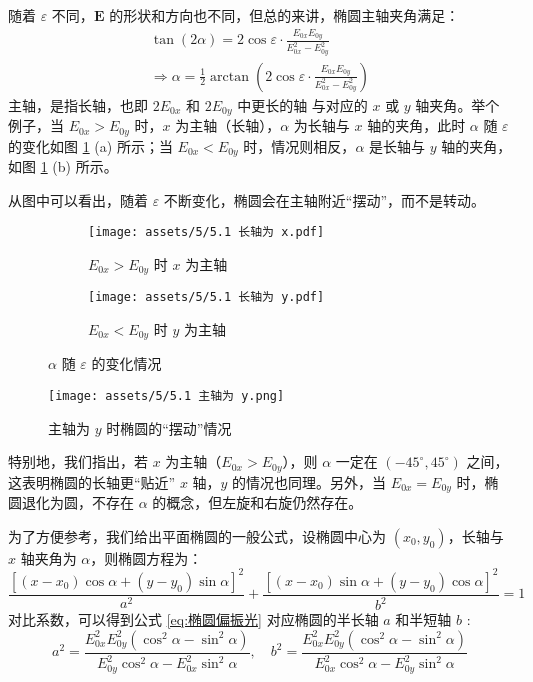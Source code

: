 \documentclass[UTF8]{report}
\theoremstyle{MyLineTheoremStyle} %
\theoremstyle{MyBlockTheoremStyle} %
\theoremstyle{MySubsubsectionStyle} %
\begin{document}
随着 $\varepsilon$ 不同，$\boldsymbol{E}$ 的形状和方向也不同，但总的来讲，椭圆主轴夹角满足：
\begin{gather}
\tan \left(2 \alpha\right) = 2 \cos \varepsilon \cdot \frac{E_{0x}E_{0y}}{E_{0x}^2 - E_{0y}^2} \\ 
\Longrightarrow \alpha = \frac{1}{2} \arctan \left(2 \cos \varepsilon \cdot \frac{E_{0x}E_{0y}}{E_{0x}^2 - E_{0y}^2}\right)
\end{gather}
主轴，是指长轴，也即 $2E_{0x}$ 和 $2E_{0y}$ 中更长的轴{\color{red} 与对应的 $x$ 或 $y$ 轴夹角}。举个例子，当 $E_{0x} > E_{0y}$ 时，$x$ 为主轴（长轴），$\alpha$ 为长轴与 $x$ 轴的夹角，此时 $\alpha$ 随 $\varepsilon$ 的变化如图 \ref{fig:alpha} (a) 所示；当 $E_{0x} < E_{0y}$ 时，情况则相反，$\alpha$ 是长轴与 $y$ 轴的夹角，如图 \ref{fig:alpha} (b) 所示。

从图中可以看出，随着 $\varepsilon$ 不断变化，椭圆会在主轴附近“摆动”，而不是转动。
\begin{figure}[H]\centering
\begin{subfigure}[b]{0.5\columnwidth}\centering
    \texttt{[image: assets/5/5.1 长轴为 x.pdf]}
    \caption{$E_{0x} > E_{0y}$ 时 $x$ 为主轴}
\end{subfigure}\hfill
\begin{subfigure}[b]{0.5\columnwidth}\centering
    \texttt{[image: assets/5/5.1 长轴为 y.pdf]}
    \caption{$E_{0x} < E_{0y}$ 时 $y$ 为主轴}
\end{subfigure}
\caption{$\alpha$ 随 $\varepsilon$ 的变化情况}
\label{fig:alpha}
\end{figure}
\begin{figure}[H]\centering
    \texttt{[image: assets/5/5.1 主轴为 y.png]}
    \caption{主轴为 $y$ 时椭圆的“摆动”情况}
\end{figure}
特别地，我们指出，若 $x$ 为主轴（$E_{0x} > E_{0y}$），则 $\alpha$ 一定在 $(-45^\circ, 45^\circ)$ 之间，这表明椭圆的长轴更“贴近” $x$ 轴，$y$ 的情况也同理。另外，当 $E_{0x} = E_{0y}$ 时，椭圆退化为圆，不存在 $\alpha$ 的概念，但左旋和右旋仍然存在。

为了方便参考，我们给出平面椭圆的一般公式，设椭圆中心为 $(x_0, y_0)$，长轴与 $x$ 轴夹角为 $\alpha$，则椭圆方程为：
\begin{equation}
\frac{\left[(x - x_0) \cos \alpha + (y - y_0) \sin \alpha \right]^2}{a^2} + \frac{\left[(x - x_0) \sin \alpha + (y - y_0) \cos \alpha  \right]^2}{b^2} = 1
\end{equation}
对比系数，可以得到公式 \ref{eq:椭圆偏振光} 对应椭圆的半长轴 $a$ 和半短轴 $b$ :
\begin{equation}
a^2 = \frac{E_{0x}^2E_{0y}^2 \left(\cos^2 \alpha - \sin^2 \alpha\right)}{E_{0y}^2\cos^2 \alpha  -  E_{0x}^2\sin^2 \alpha},\quad 
b^2 = \frac{E_{0x}^2E_{0y}^2 \left(\cos^2 \alpha - \sin^2 \alpha\right)}{E_{0x}^2\cos^2 \alpha  -  E_{0y}^2\sin^2 \alpha}
\end{equation}
\end{document}

